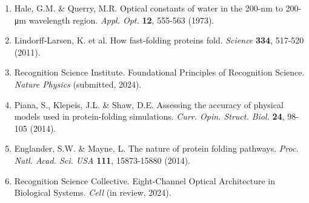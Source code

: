 \documentclass[12pt,twocolumn]{article}
\begin{document}
\begin{enumerate}
\item Hale, G.M. \& Querry, M.R. Optical constants of water in the 200-nm to 200-μm wavelength region. \textit{Appl. Opt.} \textbf{12}, 555-563 (1973).

\item Lindorff-Larsen, K. et al. How fast-folding proteins fold. \textit{Science} \textbf{334}, 517-520 (2011).

\item Recognition Science Institute. Foundational Principles of Recognition Science. \textit{Nature Physics} (submitted, 2024).

\item Piana, S., Klepeis, J.L. \& Shaw, D.E. Assessing the accuracy of physical models used in protein-folding simulations. \textit{Curr. Opin. Struct. Biol.} \textbf{24}, 98-105 (2014).

\item Englander, S.W. \& Mayne, L. The nature of protein folding pathways. \textit{Proc. Natl. Acad. Sci. USA} \textbf{111}, 15873-15880 (2014).

\item Recognition Science Collective. Eight-Channel Optical Architecture in Biological Systems. \textit{Cell} (in review, 2024).
\end{enumerate}
\end{document}
